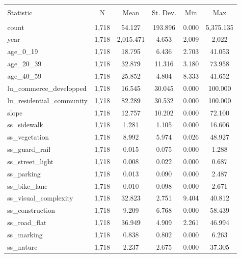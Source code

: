 
\begin{table}[!htbp] \centering 
  \caption{} 
  \label{} 
\begin{tabular}{@{\extracolsep{5pt}}lccccc} 
\\[-1.8ex]\hline 
\hline \\[-1.8ex] 
Statistic & \multicolumn{1}{c}{N} & \multicolumn{1}{c}{Mean} & \multicolumn{1}{c}{St. Dev.} & \multicolumn{1}{c}{Min} & \multicolumn{1}{c}{Max} \\ 
\hline \\[-1.8ex] 
count & 1,718 & 54.127 & 193.896 & 0.000 & 5,375.135 \\ 
year & 1,718 & 2,015.471 & 4.653 & 2,009 & 2,022 \\ 
age\_0\_19 & 1,718 & 18.795 & 6.436 & 2.703 & 41.053 \\ 
age\_20\_39 & 1,718 & 32.879 & 11.316 & 3.180 & 73.958 \\ 
age\_40\_59 & 1,718 & 25.852 & 4.804 & 8.333 & 41.652 \\ 
lu\_commerce\_developped & 1,718 & 16.545 & 30.045 & 0.000 & 100.000 \\ 
lu\_residential\_community & 1,718 & 82.289 & 30.532 & 0.000 & 100.000 \\ 
slope & 1,718 & 12.757 & 10.202 & 0.000 & 72.100 \\ 
ss\_sidewalk & 1,718 & 1.281 & 1.105 & 0.000 & 16.606 \\ 
ss\_vegetation & 1,718 & 8.992 & 5.974 & 0.026 & 48.927 \\ 
ss\_guard\_rail & 1,718 & 0.015 & 0.075 & 0.000 & 1.288 \\ 
ss\_street\_light & 1,718 & 0.008 & 0.022 & 0.000 & 0.687 \\ 
ss\_parking & 1,718 & 0.013 & 0.090 & 0.000 & 2.487 \\ 
ss\_bike\_lane & 1,718 & 0.010 & 0.098 & 0.000 & 2.671 \\ 
ss\_visual\_complexity & 1,718 & 32.823 & 2.751 & 9.404 & 40.812 \\ 
ss\_construction & 1,718 & 9.209 & 6.768 & 0.000 & 58.439 \\ 
ss\_road\_flat & 1,718 & 36.949 & 4.909 & 2.261 & 46.994 \\ 
ss\_marking & 1,718 & 0.838 & 0.802 & 0.000 & 6.263 \\ 
ss\_nature & 1,718 & 2.237 & 2.675 & 0.000 & 37.305 \\ 

\end{tabular}
\end{table}
